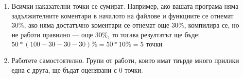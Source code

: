 \documentclass[a4paper,10pt]{article}
\begin{document}
\begin{enumerate}
			\item Всички наказателни точки се сумират. Например, ако вашата програма няма задължителните коментари в началото 
			на файлове и функциите се отнемат $30\%$, ако няма достатъчно коментари се отнемат още $30\%$, компилира се, но не 
			работи правилно — още $30\%$, то тогава резултатът ще бъде: $50*(100-30-30-30)\%= 50*10\%= 5$ точки
			
			\item Работете самостоятелно. Групи от работи, които имат твърде много прилики една с друга, ще бъдат оценявани с 				0 точки.
			
		\end{enumerate}
\end{document}
